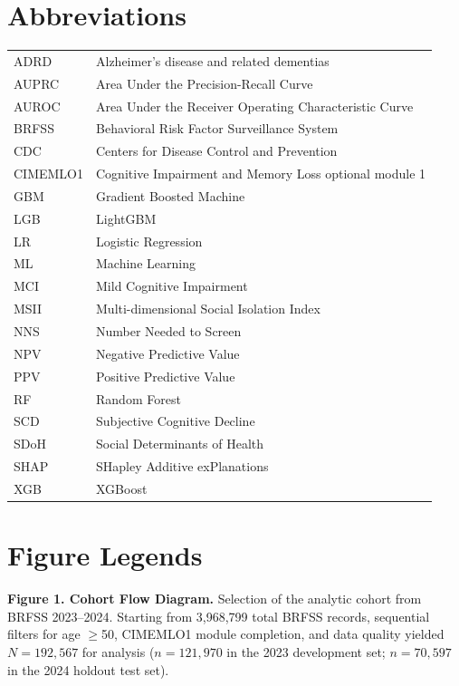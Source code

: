 \documentclass[12pt,a4paper]{article}
\begin{document}
\section*{Abbreviations}
\begin{tabular}{ll}
ADRD & Alzheimer's disease and related dementias \\
AUPRC & Area Under the Precision-Recall Curve \\
AUROC & Area Under the Receiver Operating Characteristic Curve \\
BRFSS & Behavioral Risk Factor Surveillance System \\
CDC & Centers for Disease Control and Prevention \\
CIMEMLO1 & Cognitive Impairment and Memory Loss optional module 1 \\
GBM & Gradient Boosted Machine \\
LGB & LightGBM \\
LR & Logistic Regression \\
ML & Machine Learning \\
MCI & Mild Cognitive Impairment \\
MSII & Multi-dimensional Social Isolation Index \\
NNS & Number Needed to Screen \\
NPV & Negative Predictive Value \\
PPV & Positive Predictive Value \\
RF & Random Forest \\
SCD & Subjective Cognitive Decline \\
SDoH & Social Determinants of Health \\
SHAP & SHapley Additive exPlanations \\
XGB & XGBoost \\
\end{tabular}




\newpage
\section*{Figure Legends}

\noindent\textbf{Figure 1. Cohort Flow Diagram.}
Selection of the analytic cohort from BRFSS 2023--2024. Starting from
3,968,799 total BRFSS records, sequential filters for age $\geq$50,
CIMEMLO1 module completion, and data quality yielded $N = 192{,}567$
for analysis ($n = 121{,}970$ in the 2023 development set;
$n = 70{,}597$ in the 2024 holdout test set).
\end{document}
